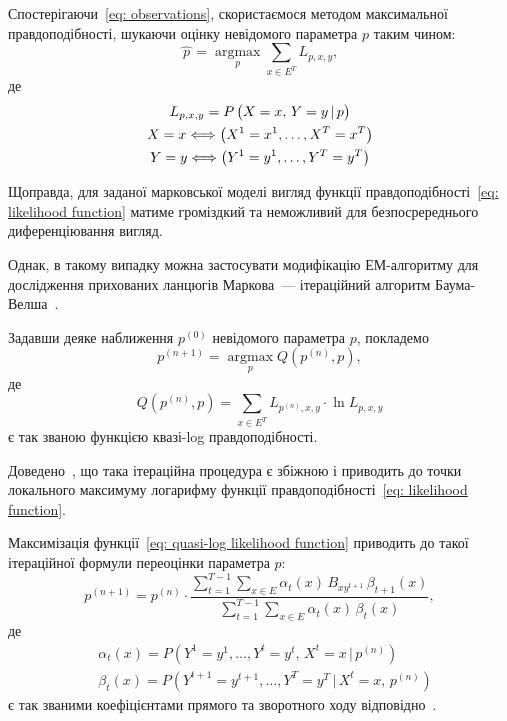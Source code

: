 \documentclass[]{iptconf}
\DeclareMathOperator*{\argmax}{argmax}
\theoremstyle{plain}
\begin{document}
Спостерігаючи~\eqref{eq: observations}, скористаємося методом максимальної правдоподібності, шукаючи оцінку невідомого параметра $p$ таким чином:
\begin{equation*}\label{eq: p ML estomation}
    \widehat{\,p\,} = \argmax\limits_{p} \sum_{x \in E^T} L_{p,x,y},
\end{equation*}
де
\begin{gather}
    L_{p,x,y} = P\, \bigl( X=x,\,Y=y\,|\,p \bigr) \label{eq: likelihood function} \\
    X=x \Longleftrightarrow \left( X^1=x^1,\ldots,X^T=x^T \right) \notag \\
    Y=y \Longleftrightarrow \left( Y^1=y^1,\ldots,Y^T=y^T \right) \notag
\end{gather}

Щоправда, для заданої марковської моделі вигляд функції правдоподібності~\eqref{eq: likelihood function} матиме громіздкий та неможливий для безпосререднього диференціювання вигляд. 

Однак, в такому випадку можна застосувати модифікацію ЕМ-алгоритму для дослідження прихованих ланцюгів Маркова~--- ітераційний алгоритм Баума-Велша~\cite[розділ 15]{Koski2001}. 

Задавши деяке наближення $p^{(0)}$ невідомого параметра $p$, покладемо
\begin{equation*}\label{eq: p MQL estomation}
    p^{(n+1)} = \argmax\limits_{p} Q\left( p^{(n)},p \right),
\end{equation*}
де
\begin{equation}\label{eq: quasi-log likelihood function}
    Q\left( p^{(n)},p \right) = \sum_{x \in E^T}L_{p^{(n)},x,y}\cdot\ln L_{p,x,y}
\end{equation}
є так званою функцією квазі-log правдоподібності.

\newpage
Доведено~\cite[розділ 4]{Koski2001}, що така ітераційна процедура є збіжною і приводить до точки локального максимуму логарифму функції правдоподібності~\eqref{eq: likelihood function}. 

Максимізація функції~\eqref{eq: quasi-log likelihood function} приводить до такої ітераційної формули переоцінки параметра $p:$
\begin{equation}\label{eq: p baum-welch estimation}
    p^{(n+1)} = p^{(n)}\cdot\frac{\sum\limits_{t=1}^{T-1}\sum\limits_{x \in E} \alpha_t(x)\,B_{xy^{t+1}}\,\beta_{t+1}(x)}{\sum\limits_{t=1}^{T-1}\sum\limits_{x \in E} \alpha_t(x)\,\beta_t(x)},
\end{equation}
де 
\begin{align}
    & \alpha_t(x) = P\left( Y^1=y^1,\ldots,Y^t=y^t,\,X^t=x \,|\, p^{(n)} \right) \label{eq: alpha, forward algorithm coefficients} \\
    & \beta_t(x) = P\left( Y^{t+1}=y^{t+1},\ldots,Y^T=y^T \,|\, X^t=x,\, p^{(n)} \right) \label{eq: beta, backward algorithm coefficients}
\end{align}
є так званими коефіцієнтами прямого та зворотного ходу відповідно~\cite[розділ 5]{Nilsson2005}. 
\end{document}
